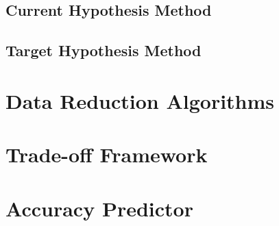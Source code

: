 \subsection{Current Hypothesis Method}


\subsection{Target Hypothesis Method}


\section{Data Reduction Algorithms}

\section{Trade-off Framework}

\section{Accuracy Predictor}